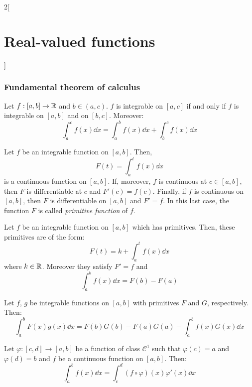 \documentclass[../../../main.tex]{subfiles}
\begin{document}
\begin{multicols}{2}[\section{Real-valued functions}]
  \subsubsection{Fundamental theorem of calculus}
  \begin{proposition}
    Let $f:[a,b]\rightarrow\mathbb{R}$ and $b\in(a,c)$. $f$ is integrable on $[a,c]$ if and only if $f$ is integrable on $[a,b]$ and on $[b,c]$. Moreover: $$\int_a^cf(x)\dd{x}=\int_a^bf(x)\dd{x}+\int_b^cf(x)\dd{x}$$
  \end{proposition}
  \begin{theorem}
    Let $f$ be an integrable function on $[a,b]$. Then, $$F(t)=\int_a^tf(x)\dd{x}$$ is a continuous function on $[a,b]$. If, moreover, $f$ is continuous at $c\in[a,b]$, then $F$ is differentiable at $c$ and $F'(c)=f(c)$. Finally, if $f$ is continuous on $[a,b]$, then $F$ is differentiable on $[a,b]$ and $F'=f$. In this last case, the function $F$ is called \emph{primitive function} of $f$.
  \end{theorem}
  \begin{theorem}
    Let $f$ be an integrable function on $[a,b]$ which has primitives. Then, these primitives are of the form: $$F(t)=k+\int_a^tf(x)\dd{x}$$ where $k\in\mathbb{R}$. Moreover they satisfy $F'=f$ and $$\int_a^bf(x)\dd{x}=F(b)-F(a)$$
  \end{theorem}
  \begin{corollary}
    Let $f$, $g$ be integrable functions on $[a,b]$ with primitives $F$ and $G$, respectively. Then: $$\int_a^bF(x)g(x)\dd{x}=F(b)G(b)-F(a)G(a)-\int_a^bf(x)G(x)\dd{x}$$
  \end{corollary}
  \begin{corollary}
    Let $\varphi:[c,d]\rightarrow[a,b]$ be a function of class $\mathcal{C}^1$ such that $\varphi(c)=a$ and $\varphi(d)=b$ and $f$ be a continuous function on $[a,b]$. Then: $$\int_a^bf(x)\dd{x}=\int_c^d(f\circ\varphi)(x)\varphi'(x)\dd{x}$$
  \end{corollary}

\end{multicols}
\end{document}
